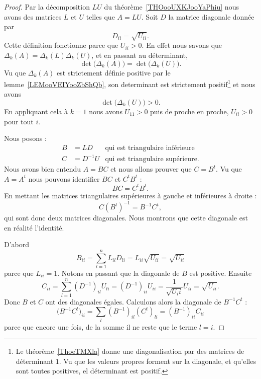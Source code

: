 \begin{proof}
	Par la décomposition \( LU\) du théorème~\ref{THOooUXKJooYaPhiu} nous avons des matrices \( L\) et \( U\) telles que \( A=LU\). Soit \( D\) la matrice diagonale donnée par
	\begin{equation}
		D_{ii}=\sqrt{ U_{ii} }.
	\end{equation}
	Cette définition fonctionne parce que \( U_{ii}>0\). En effet nous savons que \( \Delta_k(A)=\Delta_k(L)\Delta_k(U)\), et en passant au déterminant,
	\begin{equation}
		\det\big( \Delta_k(A) \big)=\det\big( \Delta_k(U) \big).
	\end{equation}
	Vu que \( \Delta_k(A)\) est strictement définie positive par le lemme~\ref{LEMooVEIYooZbShQb}, son determinant est strictement positif\footnote{Le théorème~\ref{ThoeTMXla} donne une diagonalisation par des matrices de déterminant \( 1\). Vu que les valeurs propres forment sur la diagonale, et qu'elles sont toutes positives, el déterminant est positif.} et nous avons
	\begin{equation}
		\det\big( \Delta_k(U) \big)>0.
	\end{equation}
	En appliquant cela à \( k=1\) nous avons \( U_{11}>0\) puis de proche en proche, \( U_{ii}>0\) pour tout \( i\).

	Nous posons :
	\begin{subequations}
		\begin{align}
			B & =LD       & \text{qui est triangulaire inférieure}  \\
			C & =D^{-1} U & \text{qui est triangulaire supérieure.}
		\end{align}
	\end{subequations}
	Nous avons bien entendu \( A=BC\) et nous allons prouver que \( C=B^t\). Vu que \( A=A^t\) nous pouvons identifier \( BC\) et \( C^tB^t\) :
	\begin{equation}
		BC=C^tB^t.
	\end{equation}
	En mettant les matrices triangulaires supérieures à gauche et inférieures à droite :
	\begin{equation}
		C(B^t)^{-1}=B^{-1}C^t,
	\end{equation}
	qui sont donc deux matrices diagonales. Nous montrons que cette diagonale est en réalité l'identité.

	D'abord
	\begin{equation}
		B_{ii}=\sum_{l=1}^nL_{il}D_{li}=L_{ii}\sqrt{ U_{ii} }=\sqrt{ U_{ii} }
	\end{equation}
	parce que \( L_{ii}=1\). Notons en passant que la diagonale de \( B\) est positive.  Ensuite
	\begin{equation}
		C_{ii}=\sum_{l=1}^n(D^{-1})_{il}U_{li}=(D^{-1})_{ii}U_{ii}=\frac{1}{ \sqrt{ U_ii } }U_{ii}=\sqrt{ U_{ii} }.
	\end{equation}
	Donc \( B\) et \( C\) ont des diagonales égales. Calculons alors la diagonale de \( B^{-1}C^t\) :
	\begin{equation}
		\big( B^{-1}C^t \big)_{ii}=\sum_l(B^{-1})_{il}(C^t)_{li}=(B^{-1})_{ii}C_{ii}
	\end{equation}
	parce que encore une fois, de la somme il ne reste que le terme \( l=i\).


\end{proof}
